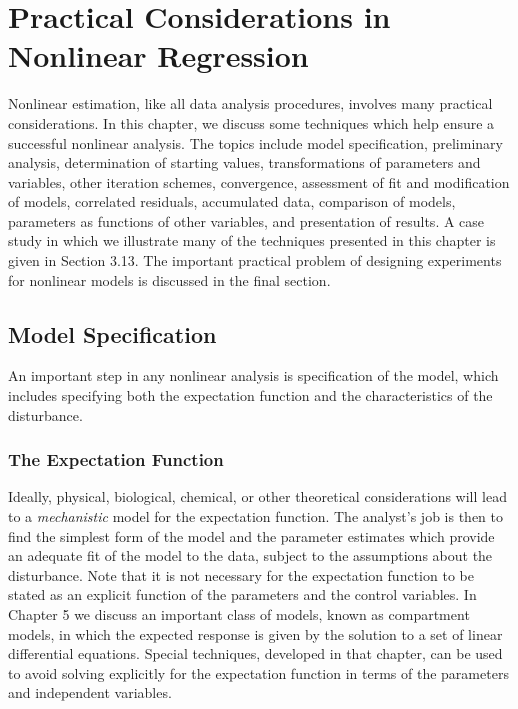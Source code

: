 \chapter[Practical Considerations]{Practical Considerations in
Nonlinear Regression}


Nonlinear estimation, like all data analysis procedures, involves
many practical considerations.
In this chapter, we discuss some
techniques which help ensure a successful nonlinear analysis.
The topics include model specification,
preliminary analysis,
determination of starting values,
transformations of parameters and variables,
other iteration schemes,
convergence,
assessment of fit and modification of models,
correlated residuals,
accumulated data,
comparison of models,
parameters as functions of other variables,
and
presentation of results.
A case study in which we illustrate many of the techniques presented
in this chapter is given in Section 3.13.
The important practical problem of designing experiments for nonlinear
models is discussed in the final section.
\section{Model Specification}

An important step in any nonlinear analysis is specification of
the model, which includes specifying both the expectation function and the
characteristics of the disturbance.
\subsection{The Expectation Function}

Ideally, physical, biological, chemical, or other theoretical
considerations will lead to a \emph{mechanistic} model for the
expectation function.
The analyst's job is then to find the simplest form of the
model and the parameter estimates which provide an adequate fit of
the model to the data, subject to the assumptions about the
disturbance.
Note that it is not necessary for the expectation function to be
stated as an explicit function of the parameters and the control
variables.
In Chapter 5 we discuss an important class of models, known as
compartment models, in which the expected response is given by
the solution to a set of linear differential equations.
Special techniques, developed in that chapter, can be used to
avoid solving explicitly for the expectation function in terms of
the parameters and independent variables.

